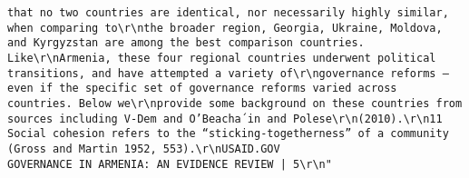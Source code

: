 \documentclass[
]{article}
\begin{document}
\begin{verbatim}
that no two countries are identical, nor necessarily highly similar, when comparing to\r\nthe broader region, Georgia, Ukraine, Moldova, and Kyrgyzstan are among the best comparison countries. Like\r\nArmenia, these four regional countries underwent political transitions, and have attempted a variety of\r\ngovernance reforms – even if the specific set of governance reforms varied across countries. Below we\r\nprovide some background on these countries from sources including V-Dem and O’Beacha´in and Polese\r\n(2010).\r\n11 Social cohesion refers to the “sticking-togetherness” of a community (Gross and Martin 1952, 553).\r\nUSAID.GOV                                                           GOVERNANCE IN ARMENIA: AN EVIDENCE REVIEW | 5\r\n"                                                                                                                                                                                                                                                                                                                                                                                                                                                                                                                                                                                                                                                                                                                                                                                                                                                                                                                                                                                                       

\end{verbatim}
\end{document}
